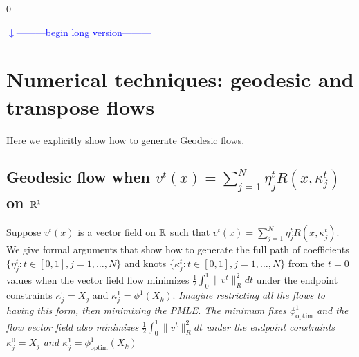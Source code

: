 \documentclass[noinfoline]{imsart}
\def\Ver{1}
\def\LongVer{0}
\begin{document}
\if\Ver\LongVer{
{\flushleft\textcolor{blue}{$\downarrow$---------begin long version---------}}\newline


\section{Numerical techniques: geodesic and transpose flows}
Here we explicitly show how to generate Geodesic flows.



\subsection{Geodesic flow  when  $v^t(x)=\sum_{j=1}^N \eta^t_j R(x,\kappa^t_j) $ on $\Bbb R^1$}
Suppose $v^t(x)$ is a vector field on $\Bbb R$ such that $v^t(x)=\sum_{j=1}^N \eta^t_j R(x,\kappa^t_j)$.
We give formal arguments that  show how to generate the full path of coefficients $\{\eta^t_j: t\in [0,1], j=1,\ldots, N\}$ and knots $\{\kappa^t_j: t\in [0,1], j=1,\ldots, N\}$ from the $t=0$ values when the vector field flow minimizes $\frac{1}{2}\int_0^1 \| v^t  \|^2_R dt$ under the endpoint constraints $\kappa_j^{0}=X_j$ and $\kappa_j^{1}=\phi^1(X_k)$. {\em Imagine restricting all the flows to having this form, then minimizing the PMLE. The minimum fixes $\phi_\text{optim}^1$ and the flow vector field also minimizes  $\frac{1}{2}\int_0^1 \| v^t  \|^2_R dt$ under the endpoint constraints $\kappa_j^{0}=X_j$ and $\kappa_j^{1}=\phi_\text{optim}^1(X_k)$}

}
\end{document}
